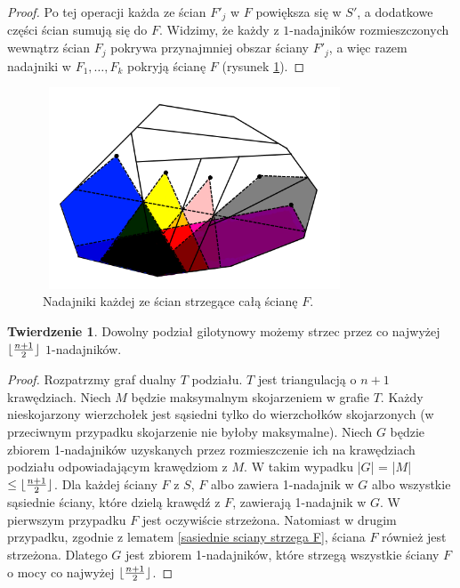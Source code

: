 \documentclass[brudnopis]{xmgr}
\DeclarePairedDelimiter\floor{\lfloor}{\rfloor}
\theoremstyle{definition}
\newtheorem{Twierdzenie}{Twierdzenie}
\begin{document}
\begin{proof}
Po tej operacji każda ze ścian $F'_j$ w $F$ powiększa się w $S'$, a dodatkowe części ścian sumują się do $F$. Widzimy, że każdy z $1$-nadajników rozmieszczonych wewnątrz ścian $F_j$ pokrywa przynajmniej obszar ściany $F'_j$, a więc razem nadajniki w $F_1,\ldots,F_k$ pokryją ścianę $F$ (rysunek \ref{fig:pokrycie f}).
\end{proof}

\begin{figure}[ht!]
  \centering
  \includegraphics[width=9cm,height=6cm]{rysunki/pokrycie_f.png}
  \caption{Nadajniki każdej ze ścian strzegące całą ścianę $F$.}
  \label{fig:pokrycie f}
\end{figure} 

\begin{Twierdzenie} \cite{knadajniki}
  Dowolny podział gilotynowy możemy strzec przez co najwyżej $\floor{\frac{n+1}{2}}$ $1$-nadajników.
\end{Twierdzenie}
\begin{proof}
	Rozpatrzmy graf dualny $T$ podziału. $T$ jest triangulacją o $n + 1$ krawędziach. Niech $M$ będzie maksymalnym skojarzeniem w grafie $T$. Każdy nieskojarzony wierzchołek jest sąsiedni tylko do wierzchołków skojarzonych (w przeciwnym przypadku skojarzenie nie byłoby maksymalne). Niech $G$ będzie zbiorem 1-nadajników uzyskanych przez rozmieszczenie ich na krawędziach podziału odpowiadającym krawędziom z $M$. W takim wypadku |$G$| = |$M$| $\le \floor{\frac{n+1}{2}}$. Dla każdej ściany $F$ z $S$, $F$ albo zawiera 1-nadajnik w $G$ albo wszystkie sąsiednie ściany, które dzielą krawędź z $F$, zawierają 1-nadajnik w $G$. W pierwszym przypadku $F$ jest oczywiście strzeżona. Natomiast w drugim przypadku, zgodnie z lematem \ref{sasiednie sciany strzega F}, ściana $F$ również jest strzeżona. Dlatego $G$ jest zbiorem 1-nadajników, które strzegą wszystkie ściany $F$ o mocy co najwyżej $\floor{\frac{n+1}{2}}$.
\end{proof}
\end{document}
